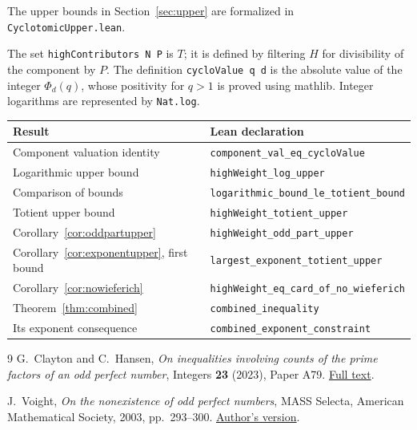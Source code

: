 \documentclass[11pt]{article}
\theoremstyle{remark}
\begin{document}
The upper bounds in Section~\ref{sec:upper} are formalized in
\texttt{CyclotomicUpper.lean}.

The set \texttt{highContributors N P} is $T$;
it is defined by filtering $H$ for divisibility of the component by $P$.
The definition \texttt{cycloValue q d} is the absolute value of the integer
$\Phi_d(q)$, whose positivity for $q>1$ is proved using mathlib.
Integer logarithms are represented by \texttt{Nat.log}.

\begin{center}
\small
\begin{tabular}{@{}p{}p{}@{}}
\toprule
Result & Lean declaration \\
\midrule
Component valuation identity & \texttt{component\_val\_eq\_cycloValue} \\[3pt]
Logarithmic upper bound & \texttt{highWeight\_log\_upper} \\[3pt]
Comparison of bounds & \texttt{logarithmic\_bound\_le\_totient\_bound} \\[3pt]
Totient upper bound & \texttt{highWeight\_totient\_upper} \\[3pt]
Corollary~\ref{cor:oddpartupper} & \texttt{highWeight\_odd\_part\_upper} \\[3pt]
Corollary~\ref{cor:exponentupper}, first bound & \texttt{largest\_exponent\_totient\_upper} \\[3pt]
Corollary~\ref{cor:nowieferich} & \texttt{highWeight\_eq\_card\_of\_no\_wieferich} \\
Theorem~\ref{thm:combined} & \texttt{combined\_inequality} \\[3pt]
Its exponent consequence & \texttt{combined\_exponent\_constraint} \\
\bottomrule
\end{tabular}
\end{center}

\begin{thebibliography}{9}
G.~Clayton and C.~Hansen,
\emph{On inequalities involving counts of the prime factors of an odd perfect number},
Integers \textbf{23} (2023), Paper A79.
\href{https://math.colgate.edu/~integers/x79/x79.pdf}{Full text}.

J.~Voight,
\emph{On the nonexistence of odd perfect numbers},
MASS Selecta, American Mathematical Society, 2003, pp.~293--300.
\href{https://jvoight.github.io/articles/opn-mass-rev-060211.pdf}{Author's version}.
\end{thebibliography}
\end{document}
